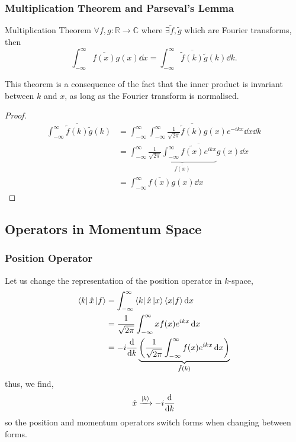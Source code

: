 \documentclass{book}
\renewcommand{\braket}[2]{\langle#1|#2\rangle}
\begin{document}
\subsubsection{Multiplication Theorem and Parseval's Lemma}
\begin{Theorems}{Multiplication Theorem}{}
	$\forall f, g : \mathbb{R} \to \mathbb{C}$ where $\exists \tilde{f},\tilde{g}$ which are Fourier transforms, then
	\begin{equation}
		\int_{-\infty}^{\infty}\overline{f(x)}g(x)\dd{x} = \int_{-\infty}^{\infty}\overline{\tilde{f}(k)}\tilde{g}(k)\dd{k}.
	\end{equation}
\end{Theorems}
This theorem is a consequence of the fact that the inner product is invariant between $k$ and $x$, as long as the Fourier transform is normalised.
\begin{proof}
	\begin{equation}
		\begin{split}
			\int_{-\infty}^{\infty}\overline{\tilde{f}(k)}\tilde{g}(k) & = \int_{-\infty}^{\infty}\int_{-\infty}^{\infty}\frac{1}{\sqrt{2\pi}}\overline{\tilde{f}(k)}g(x)e^{-ikx}\dd{x}\dd{k} \\
			& = \int_{-\infty}^{\infty}\underbrace{\frac{1}{\sqrt{2\pi}}\int_{-\infty}^{\infty}\overline{\tilde{f(x)}e^{ikx}}}_{\overline{f(x)}}g(x)\dd{x} \\
			& = \int_{-\infty}^{\infty}\overline{f(x)}g(x)\dd{x}
		\end{split}
	\end{equation}
\end{proof}
\subsection{Operators in Momentum Space}
\subsubsection{Position Operator}
Let us change the representation of the position operator in $k$-space,
\begin{equation}
	\begin{split}
	\bra{k}\hat{x}\ket{f} & = \int_{-\infty}^{\infty}\bra{k}\hat{x}\ket{x}\braket{x}{f}\dd{x} \\
	& = \frac{1}{\sqrt{2\pi}}\int_{-\infty}^{\infty}xf(x)e^{ikx}\dd{x} \\
	& = -i\dv{k}\underbrace{\left(\frac{1}{\sqrt{2\pi}}\int_{-\infty}^{\infty}f(x)e^{ikx}\dd{x}\right)}_{\tilde{f}(k)}
	\end{split}
\end{equation}
thus, we find,
\begin{equation}
	\hat{x} \xrightarrow{\ket{k}} - i\dv{k}
\end{equation}
so the position and momentum operators switch forms when changing between forms.
\end{document}
